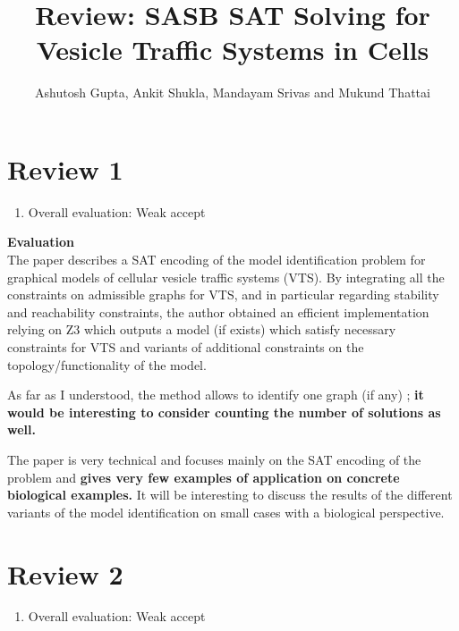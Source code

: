 \documentclass{llncs}
\begin{document}
\title{Review: SASB SAT Solving for Vesicle Traffic Systems in Cells} 

\author{Ashutosh Gupta, Ankit Shukla, Mandayam Srivas and Mukund Thattai}

\maketitle         

\section{Review 1}
\begin{enumerate}
\item {Overall evaluation: Weak accept\\}
\end{enumerate}
\textbf{{\color{black} Evaluation\\}}
{\color{green!20!blue}The paper describes a SAT encoding of the model identification problem for graphical
models of cellular vesicle traffic systems (VTS).
By integrating all the constraints on admissible graphs for VTS, and in particular
regarding stability and reachability constraints, the author obtained an efficient
implementation relying on Z3 which outputs a model (if exists) which satisfy
necessary constraints for VTS and variants of additional constraints on the
topology/functionality of the model.\\}



As far as I understood, the method allows to identify one graph (if any) ;  \textbf{it would be interesting to consider counting the number of solutions as well.}

The paper is very technical and focuses mainly on the SAT encoding of the problem
and \textbf{gives very few examples of application on concrete biological examples.}  It will be interesting to discuss the results of the different variants of the model identification on small cases with a biological perspective.\\


\section{Review 2}
\begin{enumerate}
\item {Overall evaluation: Weak accept\\}
\end{enumerate}
\end{document}
